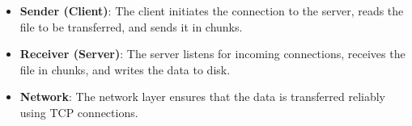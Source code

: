 \documentclass{article}
\begin{document}
\begin{itemize}
    \item \textbf{Sender (Client)}: The client initiates the connection to the server, reads the file to be transferred, and sends it in chunks.
    \item \textbf{Receiver (Server)}: The server listens for incoming connections, receives the file in chunks, and writes the data to disk.
    \item \textbf{Network}: The network layer ensures that the data is transferred reliably using TCP connections.
\end{itemize}
\end{document}
